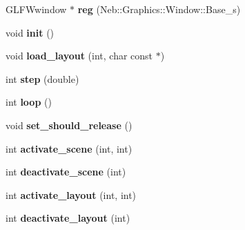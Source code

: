 \begin{DoxyCompactItemize}
\item 
\hypertarget{classNeb_1_1App_1_1Base_a45b4feac51086c0b894eb2e30ea98e03}{G\-L\-F\-Wwindow $\ast$ {\bfseries reg} (Neb\-::\-Graphics\-::\-Window\-::\-Base\-\_\-s)}\label{classNeb_1_1App_1_1Base_a45b4feac51086c0b894eb2e30ea98e03}

\item 
\hypertarget{classNeb_1_1App_1_1Base_a7872dfc7dbb8cd5a2d53326db38076cb}{void {\bfseries init} ()}\label{classNeb_1_1App_1_1Base_a7872dfc7dbb8cd5a2d53326db38076cb}

\item 
\hypertarget{classNeb_1_1App_1_1Base_a54df5d224b6b7fe039ffb5805be8460b}{void {\bfseries load\-\_\-layout} (int, char const $\ast$)}\label{classNeb_1_1App_1_1Base_a54df5d224b6b7fe039ffb5805be8460b}

\item 
\hypertarget{classNeb_1_1App_1_1Base_af1be18f5e33e09cd193ea159b75bff70}{int {\bfseries step} (double)}\label{classNeb_1_1App_1_1Base_af1be18f5e33e09cd193ea159b75bff70}

\item 
\hypertarget{classNeb_1_1App_1_1Base_a126da4ec133d3e67e06bc16c962a5aac}{int {\bfseries loop} ()}\label{classNeb_1_1App_1_1Base_a126da4ec133d3e67e06bc16c962a5aac}

\item 
\hypertarget{classNeb_1_1App_1_1Base_a3a0d4a61b10740915bd60fb24c607fea}{void {\bfseries set\-\_\-should\-\_\-release} ()}\label{classNeb_1_1App_1_1Base_a3a0d4a61b10740915bd60fb24c607fea}

\item 
\hypertarget{classNeb_1_1App_1_1Base_a495ad0c7fade8667358ae93bf8d193ef}{int {\bfseries activate\-\_\-scene} (int, int)}\label{classNeb_1_1App_1_1Base_a495ad0c7fade8667358ae93bf8d193ef}

\item 
\hypertarget{classNeb_1_1App_1_1Base_ac695c0ce0790177af0a8e8560a8368be}{int {\bfseries deactivate\-\_\-scene} (int)}\label{classNeb_1_1App_1_1Base_ac695c0ce0790177af0a8e8560a8368be}

\item 
\hypertarget{classNeb_1_1App_1_1Base_a2c15bc36fb6d54115396c83d07c1ed4e}{int {\bfseries activate\-\_\-layout} (int, int)}\label{classNeb_1_1App_1_1Base_a2c15bc36fb6d54115396c83d07c1ed4e}

\item 
\hypertarget{classNeb_1_1App_1_1Base_a8569d504264c9473c32cec6f21399839}{int {\bfseries deactivate\-\_\-layout} (int)}\label{classNeb_1_1App_1_1Base_a8569d504264c9473c32cec6f21399839}

\end{DoxyCompactItemize}
